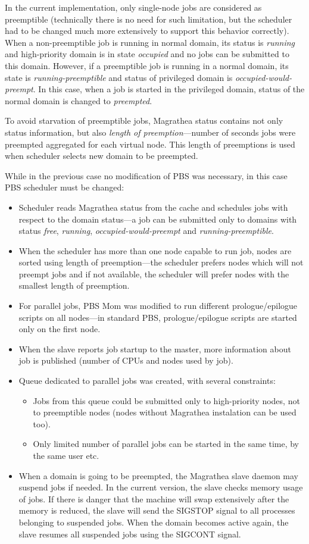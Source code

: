 \documentclass{sig-alternate}
\begin{document}
In the current implementation, only single-node jobs are considered as preemptible (technically there is no need
for such limitation, but the scheduler had to be changed much more
extensively to support this behavior correctly). When
a non-preemptible job is running in normal domain, its status is \textit{running} and high-priority domain
is in state
\textit{occupied} and no jobs can be submitted to this domain. However,
if a preemptible job is running in a normal
domain, its state is \textit{running-preemptible} and status of privileged domain is
\textit{occupied-would-preempt}. In this case, when a job is started in
the privileged domain, status of the normal domain 
is changed to \textit{preempted}.

To avoid starvation of preemptible jobs, Magrathea status contains not
only status information, but also \textit{length of preemption}---number
of seconds jobs were preempted aggregated for each virtual node.  This
length of preemptions is used when scheduler selects new domain to be
preempted.

While in the previous case no modification of PBS was necessary, in this case PBS scheduler must be changed:
\begin{itemize}
\item Scheduler reads Magrathea status from the cache and schedules jobs
with respect to the domain status---a job can be
submitted only to domains with status \emph{free}, \emph{running},
\emph{occupied-would-preempt} and \emph{running-preemptible}.
\item When the scheduler has more than one node capable to run job, nodes are sorted using length of preemption---the scheduler prefers nodes which will
not preempt jobs and if not available, the scheduler will prefer nodes with 
the smallest length of preemption.
\item For parallel jobs, PBS Mom was modified to run different prologue/epilogue scripts on all nodes---in standard 
PBS, prologue/epilogue scripts are started only on the first node.
\item When the slave reports job startup to the master, more information
about job is published (number of CPUs and nodes used by job).
\item Queue dedicated to parallel jobs was created, with several constraints:
\begin{itemize}
\item Jobs from this queue could be submitted only to high-priority nodes, not to preemptible nodes (nodes without 
 Magrathea instalation can be used too).
\item Only limited number of parallel jobs can be started in the same time, by the same user etc.
\end{itemize}
\item When a domain is going to be preempted, the Magrathea slave daemon
may suspend jobs if needed. In the current version, the slave 
checks memory usage of jobs. If there is danger that the machine will
swap extensively after the memory is reduced, the slave will send the SIGSTOP signal to all processes belonging to suspended jobs.
When the domain becomes active again, the slave resumes all suspended
jobs using the SIGCONT signal.
\end{itemize}
\end{document}
